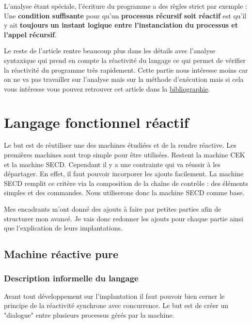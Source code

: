 \documentclass[10pt,a4paper]{report}
\begin{document}
	
	L'analyse étant spéciale, l'écriture du programme a des règles strict par exemple :
	Une \textbf{condition suffisante} pour qu'un \textbf{processus r\'{e}cursif soit r\'{e}actif} est qu'il y ait \textbf{toujours} \textbf{un instant logique entre l'instanciation du processus et l'appel r\'{e}cursif}.
	\bigbreak
	
	
	Le reste de l'article rentre beaucoup plus dans les détails avec l'analyse syntaxique qui prend en compte la réactivité du langage ce qui permet de vérifier la réactivité du programme très rapidement. Cette partie nous intéresse moins car on ne va pas travailler sur l'analyse mais sur la méthode d'exécution mais si cela vous intéresse vous pouvez retrouver cet article dans la \hyperref[biblio]{bibliographie}.
	
	
	\chapter{Langage fonctionnel réactif}\label{SECDConc4}
	
	Le but est de réutiliser une des machines étudiées et de la rendre réactive. Les premières machines sont trop simple pour être utilisées. Restent la machine CEK et la machine SECD. Cependant il y a une contrainte qui va réussir à les départager. En effet, il faut pouvoir incorporer les ajouts facilement. La machine SECD remplit ce critère via la composition de la chaîne de contrôle : des éléments simples et des commandes. Nous utiliserons donc la machine SECD comme base.
	\medbreak
	
	Mes encadrants m'ont donné des ajouts à faire par petites parties afin de structurer mon avancé. Je vais donc redonner les ajouts pour chaque partie ainsi que l'explication de leurs implantations.
	\bigbreak
	
	
	\section{Machine réactive pure}
	
	\subsection{Description informelle du langage}
	
	Avant tout développement sur l'implantation il faut pouvoir bien cerner le principe de la réactivité synchrone avec concurrence. Le but est de créer un "dialogue" entre plusieurs processus gérés par la machine. 
	\bigbreak
	
\end{document}

